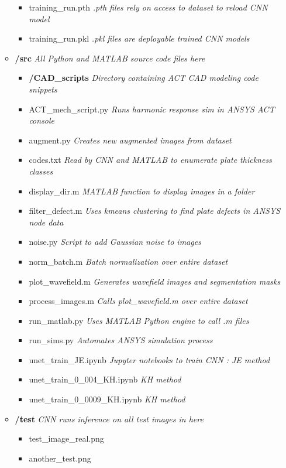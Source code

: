 \documentclass[11pt,letterpaper]{article}
\begin{document}
\begin{itemize}
\begin{itemize}
				\begin{itemize}
					\item[] training\_run.pth \hfill \textit{.pth files rely on access to dataset to reload CNN model}
					\item[] training\_run.pkl \hfill \textit{.pkl files are deployable trained CNN models}
				\end{itemize}
				\item[] \textbf{/src} \hfill \textit{All Python and MATLAB source code files here}
				\begin{itemize}
					\item[] \textbf{/CAD\_scripts} \hfill \textit{Directory containing ACT CAD modeling code snippets}
					\item[] ACT\_mech\_script.py \hfill \textit{Runs harmonic response sim in ANSYS ACT console}
					\item[] augment.py \hfill \textit{Creates new augmented images from dataset}
					\item[] codes.txt \hfill \textit{Read by CNN and MATLAB to enumerate plate thickness classes}
					\item[] display\_dir.m \hfill \textit{MATLAB function to display images in a folder}
					\item[] filter\_defect.m \hfill \textit{Uses kmeans clustering to find plate defects in ANSYS node data}
					\item[] noise.py \hfill \textit{Script to add Gaussian noise to images}
					\item[] norm\_batch.m \hfill \textit{Batch normalization over entire dataset}
					\item[] plot\_wavefield.m \hfill \textit{Generates wavefield images and segmentation masks}
					\item[] process\_images.m \hfill \textit{Calls plot\_wavefield.m over entire dataset}
					\item[] run\_matlab.py \hfill \textit{Uses MATLAB Python engine to call .m files}
					\item[] run\_sims.py \hfill \textit{Automates ANSYS simulation process}
					\item[] unet\_train\_JE.ipynb \hfill \textit{Jupyter notebooks to train CNN : JE method}
					\item[] unet\_train\_0\_004\_KH.ipynb \hfill \textit{KH method}
					\item[] unet\_train\_0\_0009\_KH.ipynb \hfill \textit{KH method}
				\end{itemize}
				\item[] \textbf{/test} \hfill \textit{CNN runs inference on all test images in here}
				\begin{itemize}
					\item[] test\_image\_real.png
					\item[] another\_test.png
				\end{itemize}
			\end{itemize}
		\end{itemize}
\end{document}
